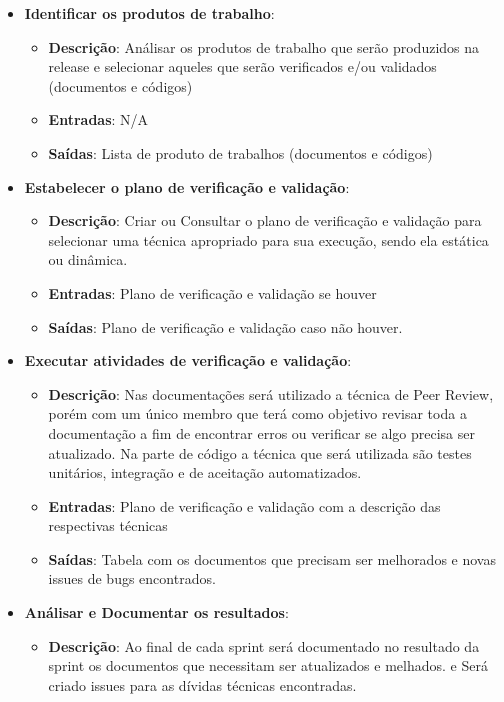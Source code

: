 \begin{itemize}
  \item \textbf{Identificar os produtos de trabalho}:
  \begin{itemize}
    \item \textbf{Descrição}: Análisar os produtos de trabalho que serão produzidos na release e selecionar
      aqueles que serão verificados e/ou validados (documentos e códigos)
    \item \textbf{Entradas}: N/A
    \item \textbf{Saídas}: Lista de produto de trabalhos (documentos e códigos)
  \end{itemize}
  \item \textbf{Estabelecer o plano de verificação e validação}:
  \begin{itemize}
    \item \textbf{Descrição}: Criar ou Consultar o plano de verificação e validação para selecionar uma técnica apropriado
    para sua execução, sendo ela estática ou dinâmica.
    \item \textbf{Entradas}: Plano de verificação e validação se houver
    \item \textbf{Saídas}: Plano de verificação e validação caso não houver.
  \end{itemize}
  \item \textbf{Executar atividades de verificação e validação}:
  \begin{itemize}
    \item \textbf{Descrição}: Nas documentações será utilizado a técnica de Peer Review, porém com um único membro
      que terá como objetivo revisar toda a documentação a fim de encontrar erros ou verificar se algo precisa ser
      atualizado. Na parte de código a técnica que será utilizada são testes unitários, integração e de aceitação
      automatizados.
    \item \textbf{Entradas}: Plano de verificação e validação com a descrição das respectivas técnicas
    \item \textbf{Saídas}: Tabela com os documentos que precisam ser melhorados e novas issues de bugs encontrados.
  \end{itemize}
  \item \textbf{Análisar e Documentar os resultados}:
  \begin{itemize}
    \item \textbf{Descrição}: Ao final de cada sprint será documentado no resultado da sprint os documentos que necessitam
    ser atualizados e melhados. e Será criado issues para as dívidas técnicas encontradas.

\end{itemize}
\end{itemize}
